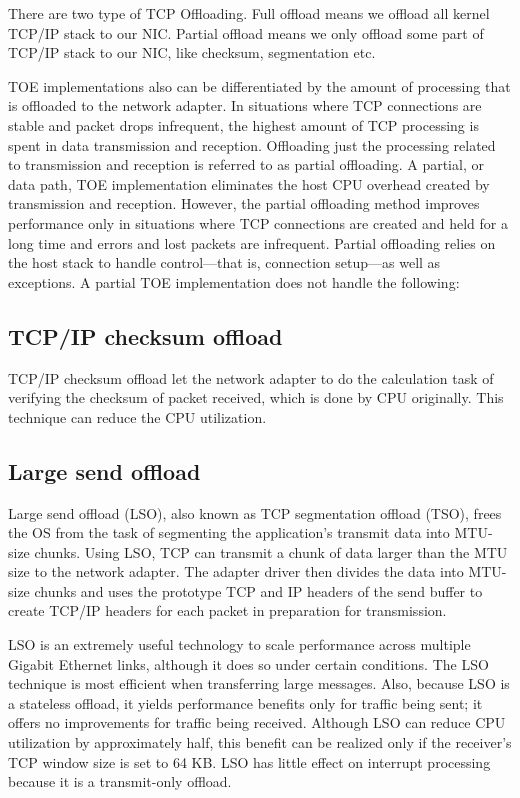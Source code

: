 \documentclass[bsc,frontabs,twoside,singlespacing,parskip,deptreport]{infthesis}     %
\begin{document}
There are two type of TCP Offloading. Full offload means we offload all kernel TCP/IP stack to our NIC. Partial offload means we only offload some part of TCP/IP stack to our NIC, like checksum, segmentation etc. 



TOE implementations also can be differentiated by the amount of processing that is offloaded to the network adapter. In situations where TCP connections are stable and packet drops infrequent, the highest amount of TCP processing is spent in data transmission and reception. Offloading just the processing related to transmission and reception is referred to as partial offloading. A partial, or data path, TOE implementation eliminates the host CPU overhead created by transmission and reception. However, the partial offloading method improves performance only in situations where TCP connections are created and held for a long time and errors and lost packets are infrequent. Partial offloading relies on the host stack to handle control—that is, connection setup—as well as exceptions. A partial TOE implementation does not handle the following:


\subsection{TCP/IP checksum offload}


TCP/IP checksum offload let the network adapter to do the calculation task of verifying the checksum of packet received, which is done by CPU originally. This technique can reduce the CPU utilization.


\subsection{Large send offload}

Large send offload (LSO), also known as TCP segmentation offload
(TSO), frees the OS from the task of segmenting the application’s
transmit data into MTU-size chunks. Using LSO, TCP can transmit
a chunk of data larger than the MTU size to the network adapter.
The adapter driver then divides the data into MTU-size chunks and
uses the prototype TCP and IP headers of the send buffer to create
TCP/IP headers for each packet in preparation for transmission.



LSO is an extremely useful technology to scale performance
across multiple Gigabit Ethernet links, although it does so under certain
conditions. The LSO technique is most efficient when transferring
large messages. Also, because LSO is a stateless offload, it yields
performance benefits only for traffic being sent; it offers no improvements
for traffic being received. Although LSO can reduce CPU utilization
by approximately half, this benefit can be realized only if
the receiver’s TCP window size is set to 64 KB. LSO has little effect
on interrupt processing because it is a transmit-only offload.
\end{document}
